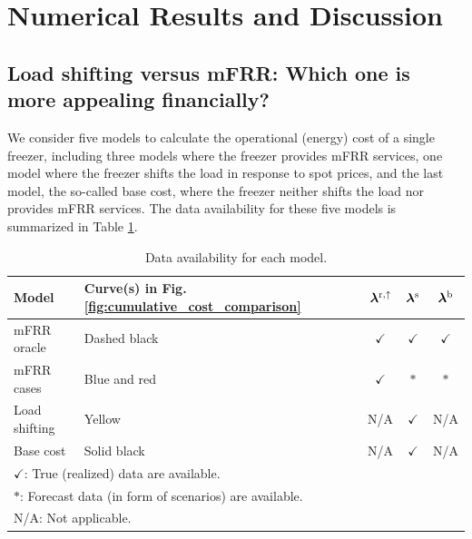 \section{Numerical Results and Discussion}\label{sec:results}
%
\subsection{Load shifting versus mFRR: Which one is more appealing financially?}

We consider five models to calculate the operational (energy) cost of a single freezer, including three models where the freezer provides mFRR services, one model where the freezer shifts the load in response to spot prices, and the last model, the so-called base cost, where the freezer neither shifts the load nor provides mFRR services. The data availability for these five models is summarized in 
Table \ref{tab:price_visibility}. 




    \begin{table}[t]
        \caption{Data availability for each model.}
        \label{tab:price_visibility}
        \centering
        \begin{tabular}{llccc}
            \toprule
            Model              & Curve(s) in Fig. \ref{fig:cumulative_cost_comparison}  & $\bm{\lambda}^{\rm{r},\uparrow}$ & $\bm{\lambda}^{\rm{s}}$ & $\bm{\lambda}^{\rm{b}}$ \\
            \midrule
            mFRR oracle   & Dashed black  & $\checkmark$        & $\checkmark$   & $\checkmark$  \\
            mFRR cases            & Blue and red & $\checkmark$         & $\ast$ & $\ast$ \\
            Load shifting & Yellow & N/A         & $\checkmark$ & N/A \\
            Base cost      &  Solid black  & N/A          & $\checkmark$    & N/A    \\
            \bottomrule
            \multicolumn{5}{l}{$\checkmark$: True (realized) data are available.} \\
            \multicolumn{5}{l}{$\ast$: Forecast data (in form of scenarios) are available.} \\
            \multicolumn{5}{l}{N/A: Not applicable.}
        \end{tabular}
        \vspace{-2mm}
    \end{table}




